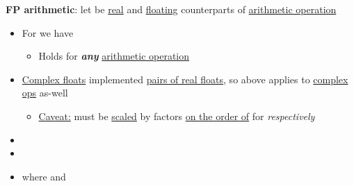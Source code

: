 \hSep %

\textbf{FP arithmetic}: let \iMbox{\ast, \circledast} be \underline{real} and
\underline{floating} counterparts of \underline{arithmetic operation}

\begin{itemize}
      \item
            For  we have

            \begin{itemize}
                  \item
                        Holds for \textbf{\emph{any}} \underline{arithmetic operation}
                        \iMbox{\circledast = \oplus, \ominus, \otimes, \oslash}
            \end{itemize}
      \item
            \underline{Complex floats} implemented \underline{pairs of real floats}, so above applies
            to \underline{complex ops} as-well

            \begin{itemize}
                  \item
                        \underline{Caveat:} 
                        must be \underline{scaled} by factors \underline{on the order of} 
                        for \iMbox{\otimes, \oslash} \emph{respectively}
            \end{itemize}
      \item
      \item
      \item
            where
            and


\end{itemize}
